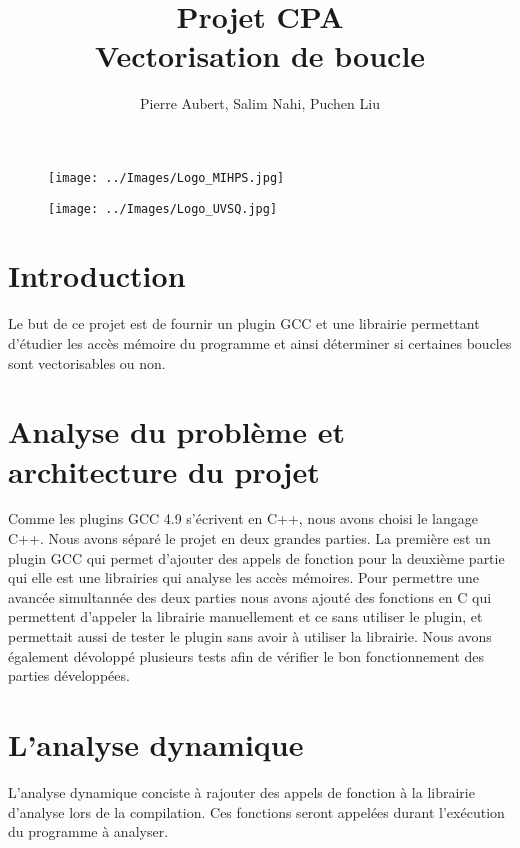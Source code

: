 \documentclass[12pt,french]{article}
\title{\color{blue}Projet CPA \\ Vectorisation de boucle}
\author{Pierre Aubert, Salim Nahi, Puchen Liu}
\begin{document}
\begin{figure}
	\begin{minipage}[b]{0.2\linewidth}
		\centering
		\texttt{[image: ../Images/Logo\_MIHPS.jpg]}
	\end{minipage}
	\hfill
	\begin{minipage}[b]{1.2\linewidth}
		\centering
		\texttt{[image: ../Images/Logo\_UVSQ.jpg]}
	\end{minipage}
\end{figure}

\maketitle

\section*{\color{blue}Introduction}

Le but de ce projet est de fournir un plugin GCC et une librairie permettant d'étudier les accès mémoire du programme et ainsi déterminer si certaines boucles sont vectorisables ou non.

\tableofcontents

\section{\color{blue}Analyse du problème et architecture du projet}

Comme les plugins GCC 4.9 s'écrivent en C++, nous avons choisi le langage C++. Nous avons séparé le projet en deux grandes parties. La première est un plugin GCC qui permet d'ajouter des appels de fonction pour la deuxième partie qui elle est une librairies qui analyse les accès mémoires. Pour permettre une avancée simultannée des deux parties nous avons ajouté des fonctions en C qui permettent d'appeler la librairie manuellement et ce sans utiliser le plugin, et permettait aussi de tester le plugin sans avoir à utiliser la librairie. Nous avons également dévoloppé plusieurs tests afin de vérifier le bon fonctionnement des parties développées.

\section{\color{blue}L'analyse dynamique}

L'analyse dynamique conciste à rajouter des appels de fonction à la librairie d'analyse lors de la compilation. Ces fonctions seront appelées durant l'exécution du programme à analyser. 
\end{document}
